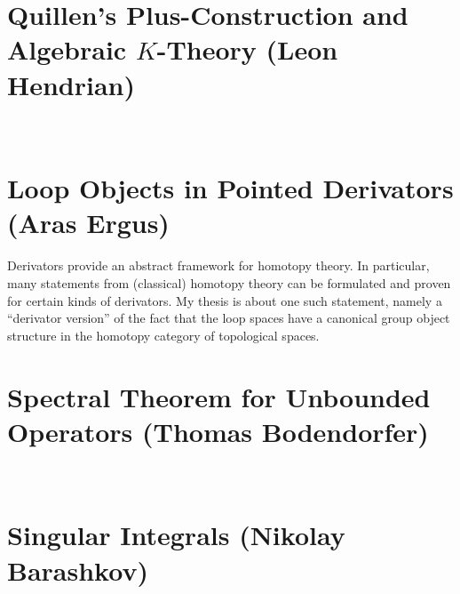 \section{Quillen's Plus-Construction and Algebraic $K$-Theory (Leon Hendrian)}

\

\section{Loop Objects in Pointed Derivators (Aras Ergus)}

Derivators provide an abstract framework for homotopy
theory. In particular, many statements from (classical) homotopy theory
can be formulated and proven for certain kinds of derivators. My thesis
is about one such statement, namely a ``derivator version'' of the fact that
the loop spaces have a canonical group object structure in the homotopy
category of topological spaces.

\section{Spectral Theorem for Unbounded Operators (Thomas Bodendorfer)}

\

\section{Singular Integrals (Nikolay Barashkov)}

\ 

